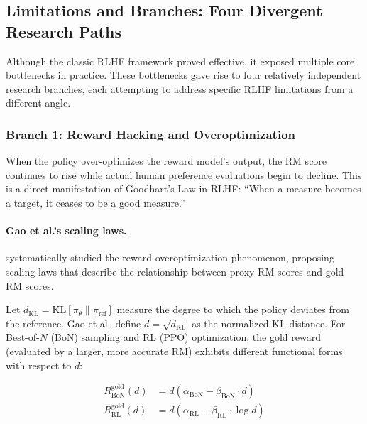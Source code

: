 \subsection{Limitations and Branches: Four Divergent Research Paths}
\label{sec:t2-branches}

Although the classic RLHF framework proved effective, it exposed multiple core bottlenecks in practice.
These bottlenecks gave rise to four relatively independent research branches,
each attempting to address specific RLHF limitations from a different angle.

\subsubsection{Branch 1: Reward Hacking and Overoptimization}
\label{sec:t2-reward-hacking}

\begin{problembox}
When the policy over-optimizes the reward model's output,
the RM score continues to rise while actual human preference evaluations begin to decline.
This is a direct manifestation of Goodhart's Law in RLHF:
``When a measure becomes a target, it ceases to be a good measure.''
\end{problembox}

\paragraph{Gao et al.'s scaling laws.}
 systematically studied the reward overoptimization phenomenon,
proposing scaling laws that describe the relationship between proxy RM scores and gold RM scores.

Let $d_{\text{KL}} = \text{KL}[\pi_\theta \| \pi_{\text{ref}}]$ measure the degree to which the policy deviates from the reference.
Gao et al.\ define $d = \sqrt{d_{\text{KL}}}$ as the normalized KL distance.
For Best-of-$N$ (BoN) sampling and RL (PPO) optimization, the gold reward (evaluated by a larger, more accurate RM) exhibits different functional forms with respect to $d$:

\begin{align}
\label{eq:pref:overopt-bon}
R_{\text{BoN}}^{\text{gold}}(d) &= d\left(\alpha_{\text{BoN}} - \beta_{\text{BoN}} \cdot d\right) \\[4pt]
\label{eq:pref:overopt-rl}
R_{\text{RL}}^{\text{gold}}(d) &= d\left(\alpha_{\text{RL}} - \beta_{\text{RL}} \cdot \log d\right)
\end{align}


